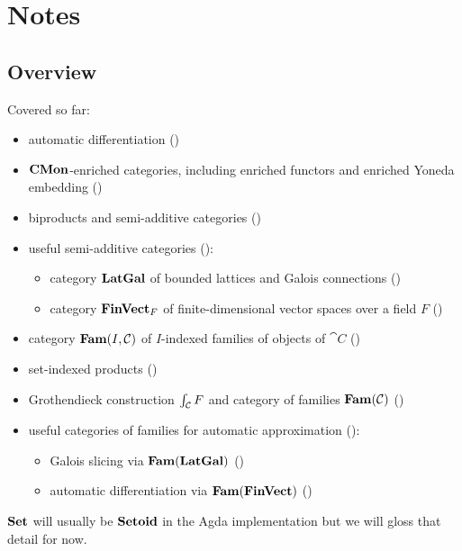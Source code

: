\section{Notes}

\subsection{Overview}

Covered so far:
\begin{itemize}
\item automatic differentiation ()
\item $\mathbf{CMon}$-enriched categories, including enriched functors and enriched Yoneda embedding ()
\item biproducts and semi-additive categories ()
\item useful semi-additive categories ():
   \begin{itemize}
   \item category $\mathbf{LatGal}$ of bounded lattices and Galois connections ()
   \item category $\mathbf{FinVect}_F$ of finite-dimensional vector spaces over a field $F$
   ()
   \end{itemize}
\item category $\mathbf{Fam}(I,\mathcal{C})$ of $I$-indexed families of objects of $\cat{C}$ ()
\item set-indexed products ()
\item Grothendieck construction $\int_{\mathcal{C}}F$ and category of families $\mathbf{Fam}(\mathcal{C})$
()
\item useful categories of families for automatic approximation
():
   \begin{itemize}
      \item Galois slicing via $\mathbf{Fam}(\mathbf{LatGal})$ ()
      \item automatic differentiation via $\mathbf{Fam}(\mathbf{FinVect})$ ()
   \end{itemize}
\end{itemize}

\noindent $\mathbf{Set}$ will usually be $\mathbf{Setoid}$ in the Agda implementation but we will gloss that detail for now.












